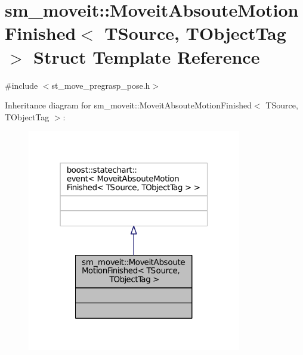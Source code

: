 \hypertarget{structsm__moveit_1_1MoveitAbsouteMotionFinished}{}\section{sm\+\_\+moveit\+:\+:Moveit\+Absoute\+Motion\+Finished$<$ T\+Source, T\+Object\+Tag $>$ Struct Template Reference}
\label{structsm__moveit_1_1MoveitAbsouteMotionFinished}


{\ttfamily \#include $<$st\+\_\+move\+\_\+pregrasp\+\_\+pose.\+h$>$}



Inheritance diagram for sm\+\_\+moveit\+:\+:Moveit\+Absoute\+Motion\+Finished$<$ T\+Source, T\+Object\+Tag $>$\+:
\nopagebreak
\begin{figure}[H]
\begin{center}
\leavevmode
\includegraphics[width=265pt]{structsm__moveit_1_1MoveitAbsouteMotionFinished__inherit__graph}
\end{center}
\end{figure}


